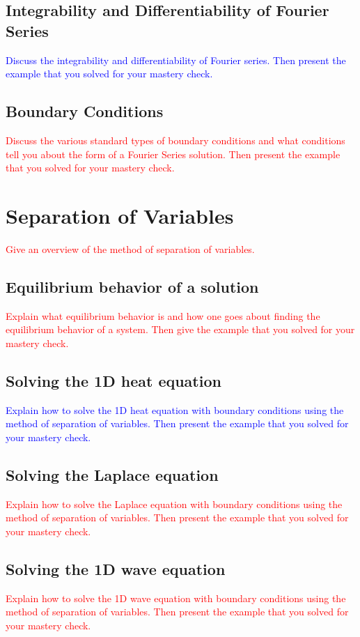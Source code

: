 \documentclass{article}
\newcommand{\red}[1]{\textcolor{red}{#1}}
\newcommand{\blue}[1]{\textcolor{blue}{#1}}
\begin{document}
\subsection{Integrability and Differentiability of Fourier Series}
\blue{Discuss the integrability and differentiability of Fourier series. Then present the example that you solved for your mastery check.}

\subsection{Boundary Conditions}
\red{Discuss the various standard types of boundary conditions and what conditions tell you about the form of a Fourier Series solution. Then present the example that you solved for your mastery check.}


\section{Separation of Variables}
\red{Give an overview of the method of separation of variables.}

\subsection{Equilibrium behavior of a solution}
\red{Explain what equilibrium behavior is and how one goes about finding the equilibrium behavior of a system. Then give the example that you solved for your mastery check.}

\subsection{Solving the 1D heat equation}
\blue{Explain how to solve the 1D heat equation with boundary conditions using the method of separation of variables. Then present the example that you solved for your mastery check.}

\subsection{Solving the Laplace equation}
\red{Explain how to solve the Laplace equation with boundary conditions using the method of separation of variables. Then present the example that you solved for your mastery check.}

\subsection{Solving the 1D wave equation}
\red{Explain how to solve the 1D wave equation with boundary conditions using the method of separation of variables. Then present the example that you solved for your mastery check.}
\end{document}
